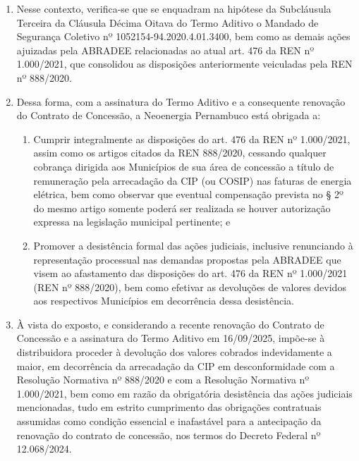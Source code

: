 \begin{enumerate}[resume]
{    Subcláusula Segunda - A DISTRIBUIDORA, de forma expressa e irrevogável, renuncia ao direito sobreo qual se fundam as ações, de qualquer natureza, que visem a questionar as cláusulas do presente TERMO ADITIVO bem como as condições do Decreto nº 12.068, de 2024. 
    
    Subcláusula Terceira - A DISTRIBUIDORA, de forma expressa e irrevogável, se compromete a desistir de eventuais ações judiciais individuais e a abster-se de promover a execução ou valer-se dos efeitos de decisões judiciais proferidas em ações ajuizadas por entidades associativas, em representação, cujo(s)direito(s) sobre os quais se funde a ação contrarie(m) as cláusulas do presente TERMO ADITIVO ou as condições do Decreto nº 12.068, de 2024.
}

\item Nesse contexto, verifica-se que se enquadram na hipótese da Subcláusula Terceira da Cláusula Décima Oitava do Termo Aditivo o Mandado de Segurança Coletivo nº 1052154-94.2020.4.01.3400, bem como as demais ações ajuizadas pela ABRADEE relacionadas ao atual art. 476 da REN nº 1.000/2021, que consolidou as disposições anteriormente veiculadas pela REN nº 888/2020.
\item Dessa forma, com a assinatura do Termo Aditivo e a consequente renovação do Contrato de Concessão, a Neoenergia Pernambuco está obrigada a:

    \begin{enumerate}
        \item Cumprir integralmente as disposições do art. 476 da REN nº 1.000/2021, assim como os artigos citados da REN 888/2020, cessando qualquer cobrança dirigida aos Municípios de sua área de concessão a título de remuneração pela arrecadação da CIP (ou COSIP) nas faturas de energia elétrica, bem como observar que eventual compensação prevista no § 2º do mesmo artigo somente poderá ser realizada se houver autorização expressa na legislação municipal pertinente; e
        \item Promover a desistência formal das ações judiciais, inclusive renunciando à representação processual nas demandas propostas pela ABRADEE que visem ao afastamento das disposições do art. 476 da REN nº 1.000/2021 (REN nº 888/2020), bem como efetivar as devoluções de valores devidos aos respectivos Municípios em decorrência dessa desistência.
    \end{enumerate}

\item À vista do exposto, e considerando a recente renovação do Contrato de Concessão e a assinatura do Termo Aditivo em 16/09/2025, impõe-se à distribuidora proceder à devolução dos valores cobrados indevidamente a maior, em decorrência da arrecadação da CIP em desconformidade com a Resolução Normativa nº 888/2020 e com a Resolução Normativa nº 1.000/2021, bem como em razão da obrigatória desistência das ações judiciais mencionadas, tudo em estrito cumprimento das obrigações contratuais assumidas como condição essencial e inafastável para a antecipação da renovação do contrato de concessão, nos termos do Decreto Federal nº 12.068/2024.

\end{enumerate}

